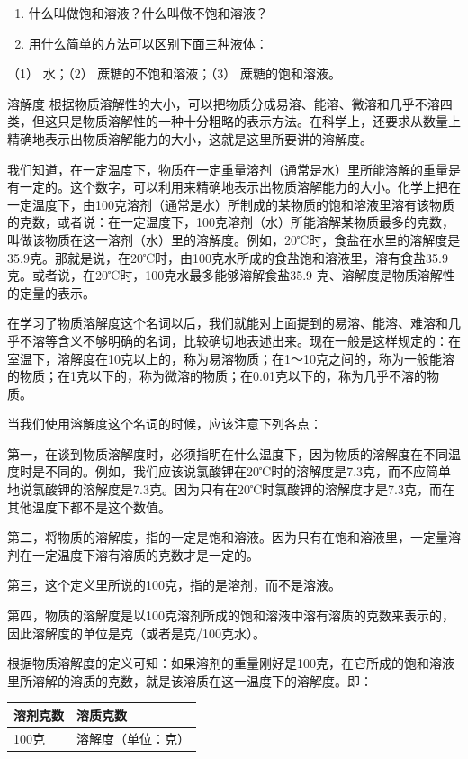 \begin{enumerate}
\item
  什么叫做饱和溶液？什么叫做不饱和溶液？
\item
  用什么简单的方法可以区别下面三种液体：
\end{enumerate}

（1） 水；（2） 蔗糖的不饱和溶液；（3） 蔗糖的饱和溶液。

溶解度
根据物质溶解性的大小，可以把物质分成易溶、能溶、微溶和几乎不溶四类，但这只是物质溶解性的一种十分粗略的表示方法。在科学上，还要求从数量上精确地表示出物质溶解能力的大小，这就是这里所要讲的溶解度。

我们知道，在一定温度下，物质在一定重量溶剂（通常是水）里所能溶解的重量是有一定的。这个数字，可以利用来精确地表示出物质溶解能力的大小。化学上把在一定温度下，由100克溶剂（通常是水）所制成的某物质的饱和溶液里溶有该物质的克数，或者说：在一定温度下，100克溶剂（水）所能溶解某物质最多的克数，叫做该物质在这一溶剂（水）里的溶解度。例如，20℃时，食盐在水里的溶解度是35.9克。那就是说，在20℃时，由100克水所成的食盐饱和溶液里，溶有食盐35.9克。或者说，在20℃时，100克水最多能够溶解食盐35.9
克、溶解度是物质溶解性的定量的表示。

在学习了物质溶解度这个名词以后，我们就能对上面提到的易溶、能溶、难溶和几乎不溶等含义不够明确的名词，比较确切地表述出来。现在一般是这样规定的：在室温下，溶解度在10克以上的，称为易溶物质；在1～10克之间的，称为一般能溶的物质；在1克以下的，称为微溶的物质；在0.01克以下的，称为几乎不溶的物质。

当我们使用溶解度这个名词的时候，应该注意下列各点：

第一，在谈到物质溶解度时，必须指明在什么温度下，因为物质的溶解度在不同温度时是不同的。例如，我们应该说氯酸钾在20℃时的溶解度是7.3克，而不应简单地说氯酸钾的溶解度是7.3克。因为只有在20℃时氯酸钾的溶解度才是7.3克，而在其他温度下都不是这个数值。

第二，将物质的溶解度，指的一定是饱和溶液。因为只有在饱和溶液里，一定量溶剂在一定温度下溶有溶质的克数才是一定的。

第三，这个定义里所说的100克，指的是溶剂，而不是溶液。

第四，物质的溶解度是以100克溶剂所成的饱和溶液中溶有溶质的克数来表示的，因此溶解度的单位是克（或者是克/100克水）。

根据物质溶解度的定义可知：如果溶剂的重量刚好是100克，在它所成的饱和溶液里所溶解的溶质的克数，就是该溶质在这一温度下的溶解度。即：

{\def\LTcaptype{none} %
\begin{longtable}[]{@{}ll@{}}
\toprule\noalign{}
溶剂克数 & 溶质克数 \\
\midrule\noalign{}
\endhead
\bottomrule\noalign{}
\endlastfoot
100克 & 溶解度（单位：克） \\
\end{longtable}
}

